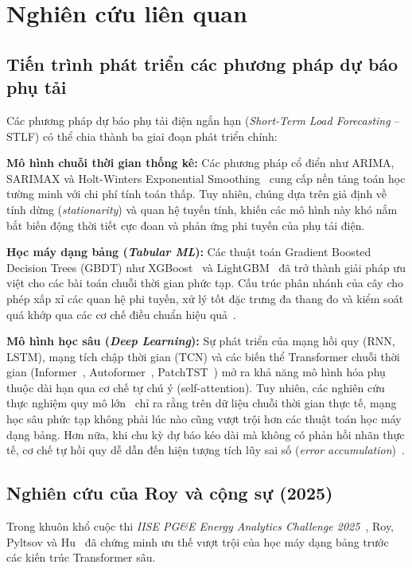 \section{Nghiên cứu liên quan}
\label{sec:related_work}

\subsection{Tiến trình phát triển các phương pháp dự báo phụ tải}
Các phương pháp dự báo phụ tải điện ngắn hạn (\textit{Short-Term Load Forecasting} -- STLF) có thể chia thành ba giai đoạn phát triển chính:

\textbf{Mô hình chuỗi thời gian thống kê:} Các phương pháp cổ điển như ARIMA, SARIMAX và Holt-Winters Exponential Smoothing~\cite{hyndman2018forecasting} cung cấp nền tảng toán học tường minh với chi phí tính toán thấp. Tuy nhiên, chúng dựa trên giả định về tính dừng (\textit{stationarity}) và quan hệ tuyến tính, khiến các mô hình này khó nắm bắt biến động thời tiết cực đoan và phản ứng phi tuyến của phụ tải điện.

\textbf{Học máy dạng bảng (\textit{Tabular ML}):} Các thuật toán Gradient Boosted Decision Trees (GBDT) như XGBoost~\cite{chen2016xgboost} và LightGBM~\cite{ke2017lightgbm} đã trở thành giải pháp ưu việt cho các bài toán chuỗi thời gian phức tạp. Cấu trúc phân nhánh của cây cho phép xấp xỉ các quan hệ phi tuyến, xử lý tốt đặc trưng đa thang đo và kiểm soát quá khớp qua các cơ chế điều chuẩn hiệu quả~\cite{hong2016probabilistic}.

\textbf{Mô hình học sâu (\textit{Deep Learning}):} Sự phát triển của mạng hồi quy (RNN, LSTM), mạng tích chập thời gian (TCN) và các biến thể Transformer chuỗi thời gian (Informer~\cite{zhou2021informer}, Autoformer~\cite{wu2021autoformer}, PatchTST~\cite{nie2023time}) mở ra khả năng mô hình hóa phụ thuộc dài hạn qua cơ chế tự chú ý (self-attention). Tuy nhiên, các nghiên cứu thực nghiệm quy mô lớn~\cite{makridakis2018statistical} chỉ ra rằng trên dữ liệu chuỗi thời gian thực tế, mạng học sâu phức tạp không phải lúc nào cũng vượt trội hơn các thuật toán học máy dạng bảng. Hơn nữa, khi chu kỳ dự báo kéo dài mà không có phản hồi nhãn thực tế, cơ chế tự hồi quy dễ dẫn đến hiện tượng tích lũy sai số (\textit{error accumulation})~\cite{lai2018modeling}.

\subsection{Nghiên cứu của Roy và cộng sự (2025)}
Trong khuôn khổ cuộc thi \textit{IISE PG\&E Energy Analytics Challenge 2025}~\cite{pge2025zenodo}, Roy, Pyltsov và Hu~\cite{roy2025hourly} đã chứng minh ưu thế vượt trội của học máy dạng bảng trước các kiến trúc Transformer sâu.

